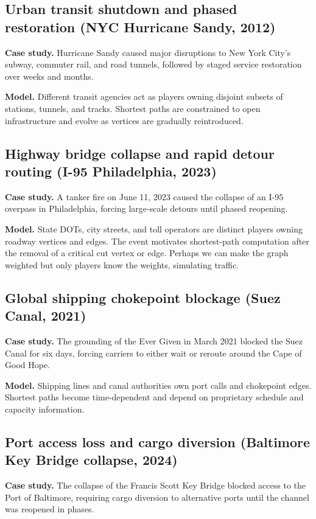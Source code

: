 \documentclass[11pt]{article}
\begin{document}
\subsection{Urban transit shutdown and phased restoration (NYC Hurricane Sandy, 2012)}
\textbf{Case study.} Hurricane Sandy caused major disruptions to New York City's subway, commuter rail, and road tunnels, followed by staged service restoration over weeks and months. \parencite{nyu2012sandytransport,dot2013sandy}

\textbf{Model.} Different transit agencies act as players owning disjoint subsets of stations, tunnels, and tracks. Shortest paths are constrained to open infrastructure and evolve as vertices are gradually reintroduced.

\subsection{Highway bridge collapse and rapid detour routing (I-95 Philadelphia, 2023)}
\textbf{Case study.} A tanker fire on June 11, 2023 caused the collapse of an I-95 overpass in Philadelphia, forcing large-scale detours until phased reopening. \parencite{axios2023i95,kodur2024i95}

\textbf{Model.} State DOTs, city streets, and toll operators are distinct players owning roadway vertices and edges. The event motivates shortest-path computation after the removal of a critical cut vertex or edge. Perhaps we can make the graph weighted but only players know the weights, simulating traffic.

\subsection{Global shipping chokepoint blockage (Suez Canal, 2021)}
\textbf{Case study.} The grounding of the Ever Given in March 2021 blocked the Suez Canal for six days, forcing carriers to either wait or reroute around the Cape of Good Hope. \parencite{pemp2021suez,tran2025suez}

\textbf{Model.} Shipping lines and canal authorities own port calls and chokepoint edges. Shortest paths become time-dependent and depend on proprietary schedule and capacity information.

\subsection{Port access loss and cargo diversion (Baltimore Key Bridge collapse, 2024)}
\textbf{Case study.} The collapse of the Francis Scott Key Bridge blocked access to the Port of Baltimore, requiring cargo diversion to alternative ports until the channel was reopened in phases. \parencite{ap2024baltimore,utk2024divert}
\end{document}
